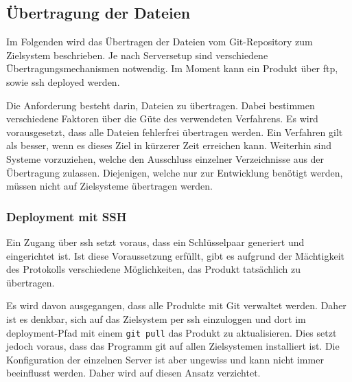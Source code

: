 




\subsection{Übertragung der Dateien} %
\label{sub:Übertragung_der_dateien}

Im Folgenden wird das Übertragen der Dateien vom Git-Repository zum Zielsystem beschrieben. Je nach Serversetup sind verschiedene Übertragungsmechanismen notwendig. Im Moment kann ein Produkt über \gls{ftp}, sowie \gls{ssh} deployed werden.

Die Anforderung besteht darin, Dateien zu übertragen. Dabei bestimmen verschiedene Faktoren über die Güte des verwendeten Verfahrens. Es wird vorausgesetzt, dass alle Dateien fehlerfrei übertragen werden. Ein Verfahren gilt als besser, wenn es dieses Ziel in kürzerer Zeit erreichen kann. Weiterhin sind Systeme vorzuziehen, welche den Ausschluss einzelner Verzeichnisse aus der Übertragung zulassen. Diejenigen, welche nur zur Entwicklung benötigt werden, müssen nicht auf Zielsysteme übertragen werden.

\subsubsection{Deployment mit SSH} %
\label{ssub:deployment_mit_ssh}

Ein Zugang über \gls{ssh} setzt voraus, dass ein Schlüsselpaar generiert und eingerichtet ist. Ist diese Voraussetzung erfüllt, gibt es aufgrund der Mächtigkeit des Protokolls verschiedene Möglichkeiten, das Produkt tatsächlich zu übertragen.

Es wird davon ausgegangen, dass alle Produkte mit Git verwaltet werden. Daher ist es denkbar, sich auf das Zielsystem per \gls{ssh} einzuloggen und dort im \Gls{deployment}-Pfad mit einem \lstinline!git pull! das Produkt zu aktualisieren. Dies setzt jedoch voraus, dass das Programm git auf allen Zielsystemen installiert ist. Die Konfiguration der einzelnen Server ist aber ungewiss und kann nicht immer beeinflusst werden. Daher wird auf diesen Ansatz verzichtet.

